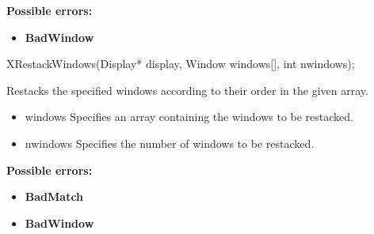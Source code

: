 \documentclass{report}
\begin{document}
\begin{itemize}
            \bigbreak \noindent
            \textbf{Possible errors:}
            \begin{itemize}
                \item \textbf{BadWindow}
            \end{itemize}

            \begin{cppcode}
                XRestackWindows(Display* display, Window windows[], int nwindows);
            \end{cppcode}
            \bigbreak \noindent
            Restacks the specified windows according to their order in the given array.

            \begin{itemize}
                \item windows Specifies an array containing the windows to be restacked.
                \item nwindows Specifies the number of windows to be restacked.
            \end{itemize}

            \bigbreak \noindent
            \textbf{Possible errors:}
            \begin{itemize}
                \item \textbf{BadMatch}
                \item \textbf{BadWindow}
            \end{itemize}


\end{itemize}
\end{document}
